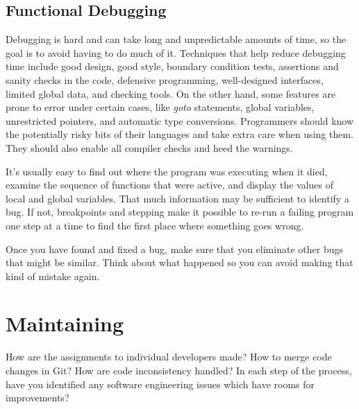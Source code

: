 \documentclass[draftclsnofoot,journal,onecolumn,12pt]{IEEEtran}
\begin{document}
\subsection{Functional Debugging}

Debugging is hard and can take long and unpredictable amounts of time, so the goal is to avoid having to do much of it. Techniques that help reduce debugging time include good design, good style, boundary condition tests, assertions and sanity checks in the code, defensive programming, well-designed interfaces, limited global data, and checking tools. On the other hand, some features are prone to error under certain cases, like \textit{goto} statements, global variables, unrestricted pointers, and automatic type conversions. Programmers should know the potentially risky bits of their languages and take extra care when using them. They should also enable all compiler checks and heed the warnings.

It's usually easy to find out where the program was executing when it died, examine the sequence of functions that were active, and display the values of local and global variables. That much information may be sufficient to identify a bug. If not, breakpoints and stepping make it possible to re-run a failing program one step at a time to find the first place where something goes wrong.

Once you have found and fixed a bug, make sure that you eliminate other bugs that might be similar. Think about what happened so you can avoid making that kind of mistake again.

\section{Maintaining}

How are the assignments to individual developers made? How to merge code changes in Git? How are code inconsistency handled? In each step of the process, have you identified any software engineering issues which have rooms for improvements?
\end{document}

